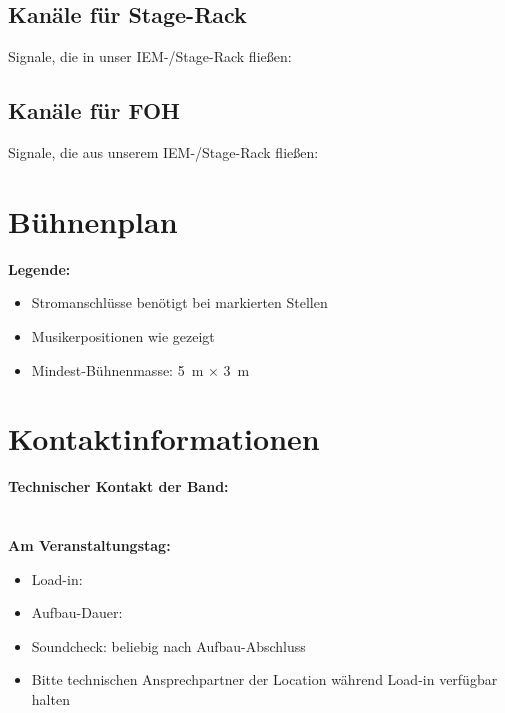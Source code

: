 \documentclass{techrider}  %
\begin{document}
\subsection{Kanäle für Stage-Rack}

Signale, die in unser IEM-/Stage-Rack fließen:

\newpage
\subsection{Kanäle für FOH}

Signale, die aus unserem IEM-/Stage-Rack fließen:

\outputChannelsTable

\newpage
\section{Bühnenplan}

\drawStagePlot

\textbf{Legende:}
\begin{itemize}
    \item Stromanschlüsse benötigt bei markierten Stellen
    \item Musikerpositionen wie gezeigt
    \item Mindest-Bühnenmasse: 5 m × 3 m
\end{itemize}


\section{Kontaktinformationen}

\textbf{Technischer Kontakt der Band:}\\
\\
\printcontactinfo
\\

\textbf{Am Veranstaltungstag:}
\begin{itemize}
    \item Load-in: \printloadintime
    \item Aufbau-Dauer: \printsetuptime
    \item Soundcheck: beliebig nach Aufbau-Abschluss
    \item Bitte technischen Ansprechpartner der Location während Load-in verfügbar halten
\end{itemize}
\end{document}
